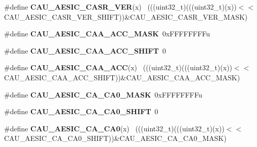 \begin{DoxyCompactItemize}
\item 
\hypertarget{group___c_a_u___register___masks_ga7d3368edd971c63c41465dd6774b7229}{}\#define {\bfseries C\+A\+U\+\_\+\+A\+E\+S\+I\+C\+\_\+\+C\+A\+S\+R\+\_\+\+V\+E\+R}(x)                                    ~(((uint32\+\_\+t)(((uint32\+\_\+t)(x))$<$$<$C\+A\+U\+\_\+\+A\+E\+S\+I\+C\+\_\+\+C\+A\+S\+R\+\_\+\+V\+E\+R\+\_\+\+S\+H\+I\+F\+T))\&C\+A\+U\+\_\+\+A\+E\+S\+I\+C\+\_\+\+C\+A\+S\+R\+\_\+\+V\+E\+R\+\_\+\+M\+A\+S\+K)\label{group___c_a_u___register___masks_ga7d3368edd971c63c41465dd6774b7229}

\item 
\hypertarget{group___c_a_u___register___masks_ga6a186e09605a44795ee98614428823a0}{}\#define {\bfseries C\+A\+U\+\_\+\+A\+E\+S\+I\+C\+\_\+\+C\+A\+A\+\_\+\+A\+C\+C\+\_\+\+M\+A\+S\+K}~0x\+F\+F\+F\+F\+F\+F\+F\+Fu\label{group___c_a_u___register___masks_ga6a186e09605a44795ee98614428823a0}

\item 
\hypertarget{group___c_a_u___register___masks_gaac1b5dee501da2ddedcc86c0a91246f4}{}\#define {\bfseries C\+A\+U\+\_\+\+A\+E\+S\+I\+C\+\_\+\+C\+A\+A\+\_\+\+A\+C\+C\+\_\+\+S\+H\+I\+F\+T}~0\label{group___c_a_u___register___masks_gaac1b5dee501da2ddedcc86c0a91246f4}

\item 
\hypertarget{group___c_a_u___register___masks_ga83074eff7f48fabf66316b3caa6756eb}{}\#define {\bfseries C\+A\+U\+\_\+\+A\+E\+S\+I\+C\+\_\+\+C\+A\+A\+\_\+\+A\+C\+C}(x)                                      ~(((uint32\+\_\+t)(((uint32\+\_\+t)(x))$<$$<$C\+A\+U\+\_\+\+A\+E\+S\+I\+C\+\_\+\+C\+A\+A\+\_\+\+A\+C\+C\+\_\+\+S\+H\+I\+F\+T))\&C\+A\+U\+\_\+\+A\+E\+S\+I\+C\+\_\+\+C\+A\+A\+\_\+\+A\+C\+C\+\_\+\+M\+A\+S\+K)\label{group___c_a_u___register___masks_ga83074eff7f48fabf66316b3caa6756eb}

\item 
\hypertarget{group___c_a_u___register___masks_gaf4f3bf1111180d2452151c2c954968ff}{}\#define {\bfseries C\+A\+U\+\_\+\+A\+E\+S\+I\+C\+\_\+\+C\+A\+\_\+\+C\+A0\+\_\+\+M\+A\+S\+K}~0x\+F\+F\+F\+F\+F\+F\+F\+Fu\label{group___c_a_u___register___masks_gaf4f3bf1111180d2452151c2c954968ff}

\item 
\hypertarget{group___c_a_u___register___masks_gab82f969160eac7bf345cc29560bf2a0a}{}\#define {\bfseries C\+A\+U\+\_\+\+A\+E\+S\+I\+C\+\_\+\+C\+A\+\_\+\+C\+A0\+\_\+\+S\+H\+I\+F\+T}~0\label{group___c_a_u___register___masks_gab82f969160eac7bf345cc29560bf2a0a}

\item 
\hypertarget{group___c_a_u___register___masks_ga53c2cfa432836537ef92d9314500ba6d}{}\#define {\bfseries C\+A\+U\+\_\+\+A\+E\+S\+I\+C\+\_\+\+C\+A\+\_\+\+C\+A0}(x)                                        ~(((uint32\+\_\+t)(((uint32\+\_\+t)(x))$<$$<$C\+A\+U\+\_\+\+A\+E\+S\+I\+C\+\_\+\+C\+A\+\_\+\+C\+A0\+\_\+\+S\+H\+I\+F\+T))\&C\+A\+U\+\_\+\+A\+E\+S\+I\+C\+\_\+\+C\+A\+\_\+\+C\+A0\+\_\+\+M\+A\+S\+K)\label{group___c_a_u___register___masks_ga53c2cfa432836537ef92d9314500ba6d}


\end{DoxyCompactItemize}
